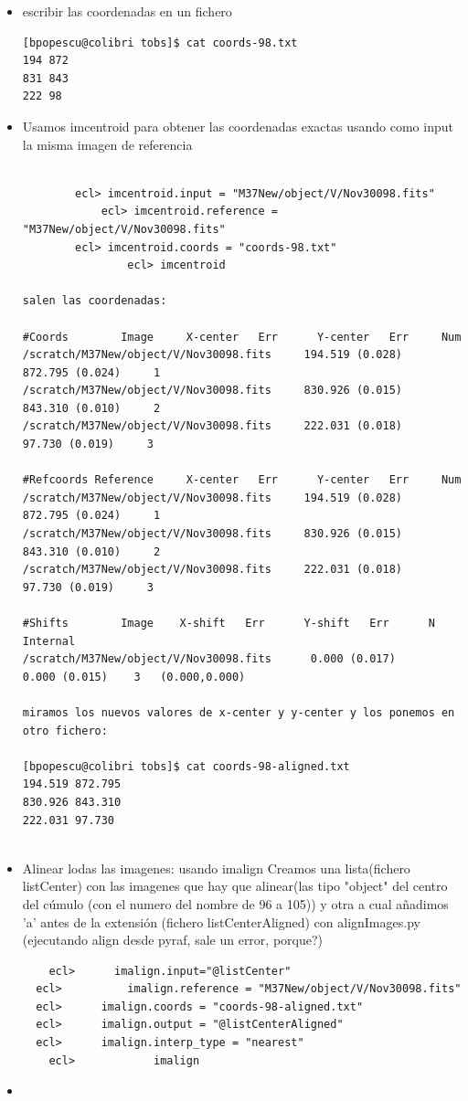 \documentclass{article}
\begin{document}
\begin{itemize}
\item  escribir las coordenadas en un fichero
\begin{verbatim}
[bpopescu@colibri tobs]$ cat coords-98.txt
194 872
831 843
222 98
\end{verbatim}

\item Usamos imcentroid para obtener las coordenadas exactas usando como input la misma imagen de referencia

\begin{verbatim}

        ecl> imcentroid.input = "M37New/object/V/Nov30098.fits" 
	    	ecl> imcentroid.reference = "M37New/object/V/Nov30098.fits" 
       	ecl> imcentroid.coords = "coords-98.txt"
				ecl> imcentroid

salen las coordenadas:

#Coords        Image     X-center   Err      Y-center   Err     Num
/scratch/M37New/object/V/Nov30098.fits     194.519 (0.028)     872.795 (0.024)     1
/scratch/M37New/object/V/Nov30098.fits     830.926 (0.015)     843.310 (0.010)     2
/scratch/M37New/object/V/Nov30098.fits     222.031 (0.018)      97.730 (0.019)     3

#Refcoords Reference     X-center   Err      Y-center   Err     Num
/scratch/M37New/object/V/Nov30098.fits     194.519 (0.028)     872.795 (0.024)     1
/scratch/M37New/object/V/Nov30098.fits     830.926 (0.015)     843.310 (0.010)     2
/scratch/M37New/object/V/Nov30098.fits     222.031 (0.018)      97.730 (0.019)     3

#Shifts        Image    X-shift   Err      Y-shift   Err      N      Internal
/scratch/M37New/object/V/Nov30098.fits      0.000 (0.017)      0.000 (0.015)    3   (0.000,0.000)

miramos los nuevos valores de x-center y y-center y los ponemos en otro fichero:

[bpopescu@colibri tobs]$ cat coords-98-aligned.txt 
194.519 872.795
830.926 843.310
222.031 97.730


\end{verbatim}

\item Alinear lodas las imagenes: usando imalign
Creamos una lista(fichero listCenter) con las imagenes  que hay que alinear(las tipo "object" del centro del cúmulo (con el numero del nombre  de 96 a 105)) y otra a cual añadimos 'a' antes de la extensión (fichero listCenterAligned) con alignImages.py (ejecutando align desde pyraf, sale un error, porque?)

\begin{verbatim}
 	ecl>      imalign.input="@listCenter"   
  ecl>  		imalign.reference = "M37New/object/V/Nov30098.fits" 
  ecl>     	imalign.coords = "coords-98-aligned.txt" 
  ecl>    	imalign.output = "@listCenterAligned" 
  ecl>    	imalign.interp_type = "nearest" 
	ecl>			imalign
\end{verbatim}

\item 


\end{itemize}
\end{document}
